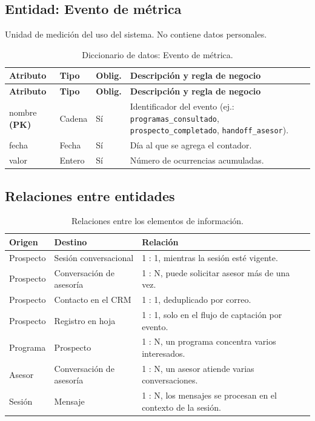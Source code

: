 \documentclass[12pt,a4paper]{report}
\newcommand{\tablacompacta}{\setstretch{1.1}\small}
\newcommand{\cabecera}[1]{\rowcolor{filacabecera}#1}
\begin{document}
\subsection{Entidad: Evento de métrica}

Unidad de medición del uso del sistema. No contiene datos personales.

{\tablacompacta
\begin{longtable}{p{3.1cm}p{2.2cm}p{1.3cm}p{6.0cm}}
\caption{Diccionario de datos: Evento de métrica.}\label{tab:dd-metrica}\\
\toprule
\cabecera{\textbf{Atributo}} & \textbf{Tipo} & \textbf{Oblig.} & \textbf{Descripción y regla de negocio} \\
\midrule
\endfirsthead
\toprule
\textbf{Atributo} & \textbf{Tipo} & \textbf{Oblig.} & \textbf{Descripción y regla de negocio} \\
\midrule
\endhead
\bottomrule
\endfoot
nombre \textbf{(PK)} & Cadena & Sí & Identificador del evento (ej.: \texttt{programas\_consultado}, \texttt{prospecto\_completado}, \texttt{handoff\_asesor}). \\
fecha & Fecha & Sí & Día al que se agrega el contador. \\
valor & Entero & Sí & Número de ocurrencias acumuladas. \\
\end{longtable}}

\subsection{Relaciones entre entidades}

\begin{table}[H]
    \centering
    \tablacompacta
    \begin{tabularx}{\textwidth}{llX}
        \toprule
        \cabecera{\textbf{Origen}} & \textbf{Destino} & \textbf{Relación} \\
        \midrule
        Prospecto & Sesión conversacional & 1 : 1, mientras la sesión esté vigente. \\
        Prospecto & Conversación de asesoría & 1 : N, puede solicitar asesor más de una vez. \\
        Prospecto & Contacto en el CRM & 1 : 1, deduplicado por correo. \\
        Prospecto & Registro en hoja & 1 : 1, solo en el flujo de captación por evento. \\
        Programa & Prospecto & 1 : N, un programa concentra varios interesados. \\
        Asesor & Conversación de asesoría & 1 : N, un asesor atiende varias conversaciones. \\
        Sesión & Mensaje & 1 : N, los mensajes se procesan en el contexto de la sesión. \\
        \bottomrule
    \end{tabularx}
    \caption{Relaciones entre los elementos de información.}
\end{table}
\end{document}
